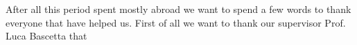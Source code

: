 After all this period spent mostly abroad we want to spend a few words to thank everyone that have helped us. First of all we want to thank our supervisor Prof. Luca Bascetta that  





